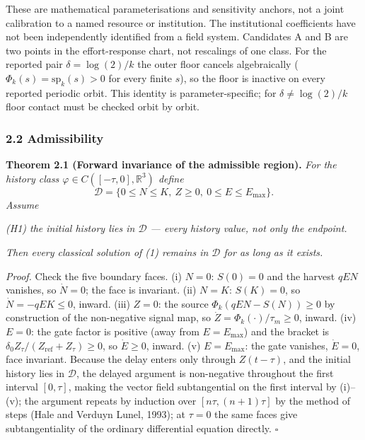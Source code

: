 \documentclass[11pt]{article}
\begin{document}
These are mathematical parameterisations and sensitivity anchors, not a
joint calibration to a named resource or institution. The institutional
coefficients have not been independently identified from a field system.
Candidates A and B are two points in the effort-response chart, not
rescalings of one class. For the reported pair \(\delta = \log(2)/k\)
the outer floor cancels algebraically
(\(\Phi_k(s) = \mathrm{sp}_k(s) > 0\) for every finite \(s\)), so the
floor is inactive on every reported periodic orbit. This identity is
parameter-specific; for \(\delta \ne \log(2)/k\) floor contact must be
checked orbit by orbit.

\subsubsection{2.2 Admissibility}\label{admissibility}

\textbf{Theorem 2.1 (Forward invariance of the admissible region).}
\emph{For the history class \(\varphi \in C([-\tau, 0], \mathbb{R}^3)\)
define}
\[\mathcal{D} = \{ 0 \le N \le K,\ Z \ge 0,\ 0 \le E \le E_{\max} \}.\]
\emph{Assume}

\emph{(H1) the initial history lies in \(\mathcal{D}\) --- every history
value, not only the endpoint.}

\emph{Then every classical solution of (1) remains in \(\mathcal{D}\)
for as long as it exists.}

\emph{Proof.} Check the five boundary faces. (i) \(N = 0\): \(S(0) = 0\)
and the harvest \(qEN\) vanishes, so \(\dot N = 0\); the face is
invariant. (ii) \(N = K\): \(S(K) = 0\), so \(\dot N = -qEK \le 0\),
inward. (iii) \(Z = 0\): the source \(\Phi_k(qEN - S(N)) \ge 0\) by
construction of the non-negative signal map, so
\(\dot Z = \Phi_k(\cdot)/\tau_m \ge 0\), inward. (iv) \(E = 0\): the
gate factor is positive (away from \(E = E_{\max}\)) and the bracket is
\(\delta_0 Z_\tau/(Z_{\mathrm{ref}} + Z_\tau) \ge 0\), so
\(\dot E \ge 0\), inward. (v) \(E = E_{\max}\): the gate vanishes,
\(\dot E = 0\), face invariant. Because the delay enters only through
\(Z(t - \tau)\), and the initial history lies in \(\mathcal{D}\), the
delayed argument is non-negative throughout the first interval
\([0, \tau]\), making the vector field subtangential on the first
interval by (i)--(v); the argument repeats by induction over
\([n\tau, (n+1)\tau]\) by the method of steps (Hale and Verduyn Lunel,
1993); at \(\tau = 0\) the same faces give subtangentiality of the
ordinary differential equation directly. \ensuremath{\square}
\end{document}
